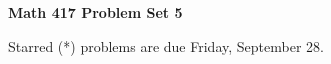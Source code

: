 \documentclass[12pt]{article}
\begin{document}
\def\ctln{\centerline}
\def\msk{\medskip}
\def\bsk{\bigskip}
\def\ssk{\smallskip}
\def\hsk{\hskip.3in}
\def\ra{\rightarrow}
\def\ubr{\underbar}

\def\mt{{\mathcal T}}
\def\mb{{\mathcal B}}
\def\ms{{\mathcal S}}
\def\mu{{\mathcal U}}
\def\mv{{\mathcal V}}

\def\bbr{{\mathbb R}}
\def\bbz{{\mathbb Z}}
\def\spc{$~$\hskip.15in$~$}

\def\sset{\subseteq}
\def\del{\partial}
\def\lra{$\Leftrightarrow$}
\def\bra{$\Rightarrow$}




\ctln{\bf Math 417 Problem Set 5}

\msk

Starred (*) problems are due Friday, September 28.
\end{document}

